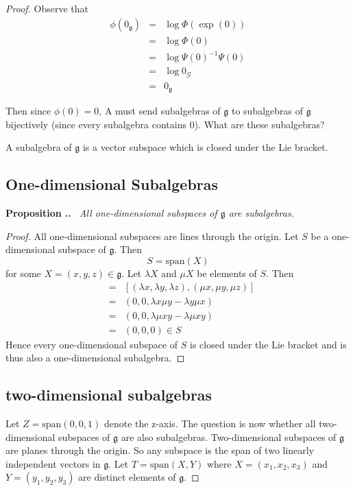 \documentclass[honours]{UNSWthesis}
\newcommand{\G}{\mathcal{G}}
\newcommand{\g}{\mathfrak{g}}
\newcommand{\1}{\mathbf{e}_{1}}
\newcommand{\2}{\mathbf{e}_{3}}
\newcommand{\3}{\mathbf{e}_{3}}
\newcounter{Item}[section]
\newenvironment{Proposition}{\medskip
                            \refstepcounter{Item}
                            \noindent
                           {\bf Proposition \thesection.\theItem.}\ %
                            \begingroup \sl}
                           {\endgroup\medskip}
\begin{document}
\begin{proof}
Observe that 
\begin{eqnarray*}
\phi(0_{\g})&=&\log \Phi (\exp(0)) \\
&=& \log \Phi(0) \\
&=& \log \Psi(0)^{-1}\Psi(0) \\
&=& \log 0_{\G} \\
&=& 0_{\g}
\end{eqnarray*}

Then since $\phi(0)=0$, A must send subalgebras of $\g$ to subalgebras of $\g$ bijectively (since every subalgebra contains $0$). What are these subalgebras?

A subalgebra of $\g$ is a vector subspace which is closed under the Lie bracket. 

\subsection{One-dimensional Subalgebras}
\begin{Proposition}
All one-dimensional subspaces of $\g$ are subalgebras.
\end{Proposition}

\begin{proof}
All one-dimensional subspaces are lines through the origin. Let $S$ be a one-dimensional subspace of $\g$. Then 
\[
S= \text{span}(X)
\]
for some $X=(x,y,z) \in \g$. Let $\lambda X$ and $\mu X$ be elements of $S$. Then 
\begin{eqnarray*}
[\lambda X,\mu X] &=& [(\lambda x, \lambda y, \lambda z), (\mu x, \mu y, \mu z)] \\
&=& (0,0, \lambda x \mu y - \lambda y \mu x) \\
&=& (0,0, \lambda  \mu xy - \lambda \mu xy) \\
&=& (0,0,0) \in S
\end{eqnarray*}
Hence every one-dimensional subspace of $S$ is closed under the Lie bracket and is thus also a one-dimensional subalgebra. 
\end{proof}

\subsection{two-dimensional subalgebras}
Let $Z=\text{span}(0,0,1)$ denote the z-axis.
The question is now whether all two-dimensional subspaces of $\g$ are also subalgebras. Two-dimensional subspaces of $\g$ are planes through the origin. So any subspace is the span of two linearly independent vectors in $\g$.
Let $T= \text{span}(X ,Y)$ where $X=(x_{1},x_{2},x_{3})$ and $Y=(y_{1},y_{2},y_{3})$ are distinct elements of $\g$.


\end{proof}
\end{document}
